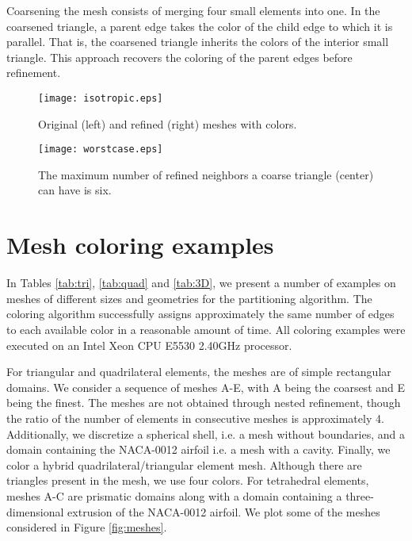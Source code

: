\documentclass[12pt]{article}
\begin{document}
Coarsening the mesh consists of merging four small elements into one.  In the coarsened triangle, a parent edge takes the color of the child edge to which it is parallel.  That is, the coarsened triangle inherits the colors of the interior small triangle.  This approach recovers the coloring of the parent edges before refinement.






\begin{figure}
	\centering
	\texttt{[image: isotropic.eps]}
	\caption{Original (left) and refined (right) meshes with colors.}
	\label{fig:isotropic}
\end{figure}

\begin{figure}
	\centering
	\texttt{[image: worstcase.eps]}
	\caption{The maximum number of refined neighbors a coarse triangle (center) can have is six.}
	\label{fig:worstcase}
\end{figure}






\section{Mesh coloring examples} \label{sec:examples}
In Tables \ref{tab:tri}, \ref{tab:quad} and \ref{tab:3D}, we present a number of examples on meshes of different sizes and geometries for the partitioning algorithm.  The coloring algorithm successfully assigns approximately the same number of edges to each available color in a reasonable amount of time.  All coloring examples were executed on an Intel Xeon CPU E5530 2.40GHz processor.

For triangular and quadrilateral elements, the meshes are of simple rectangular domains.  We consider a sequence of meshes A-E, with A being the coarsest and E being the finest.  The meshes are not obtained through nested refinement, though the ratio of the number of elements in consecutive meshes is approximately 4.  Additionally, we discretize a spherical shell, i.e. a mesh without boundaries, and a domain containing the NACA-0012 airfoil i.e. a mesh with a cavity.  Finally, we color a hybrid quadrilateral/triangular element mesh.  Although there are triangles present in the mesh, we use four colors.  For tetrahedral elements, meshes A-C are prismatic domains along with a domain containing a three-dimensional extrusion of the NACA-0012 airfoil.  We plot some of the meshes considered in Figure \ref{fig:meshes}.
\end{document}
